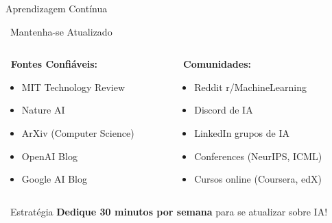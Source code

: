 \documentclass[aspectratio=169,12pt]{beamer}
\begin{document}
\begin{frame}{Aprendizagem Contínua}
    \begin{block}{\faGraduationCap\, Mantenha-se Atualizado}
        \begin{columns}
            \begin{column}{0.5\textwidth}
                \textbf{\faNewspaper\, Fontes Confiáveis:}
                \begin{itemize}
                    \item MIT Technology Review
                    \item Nature AI
                    \item ArXiv (Computer Science)
                    \item OpenAI Blog
                    \item Google AI Blog
                \end{itemize}
            \end{column}
            \begin{column}{0.5\textwidth}
                \textbf{\faUsers\, Comunidades:}
                \begin{itemize}
                    \item Reddit r/MachineLearning
                    \item Discord de IA
                    \item LinkedIn grupos de IA
                    \item Conferences (NeurIPS, ICML)
                    \item Cursos online (Coursera, edX)
                \end{itemize}
            \end{column}
        \end{columns}
    \end{block}
    
    \begin{exampleblock}{\faCalendar\, Estratégia}
        \textbf{Dedique 30 minutos por semana} para se atualizar sobre IA!
    \end{exampleblock}
\end{frame}

\end{document}
